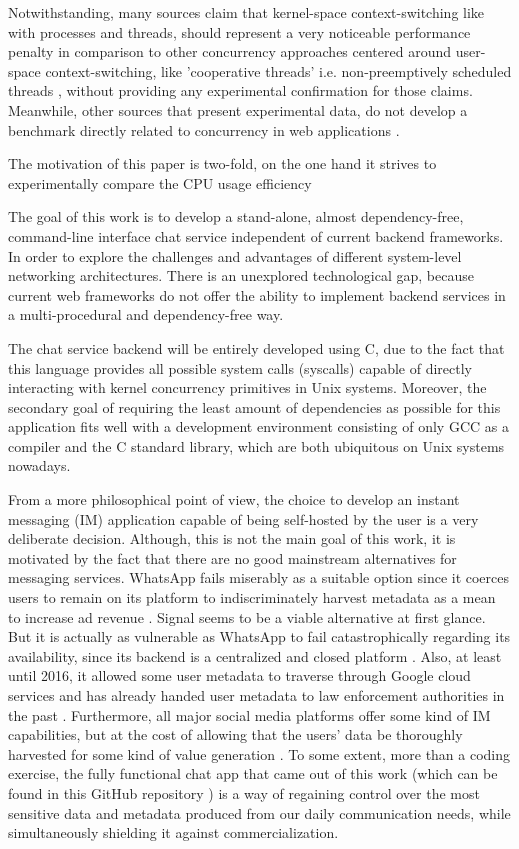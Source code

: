 Notwithstanding, many sources claim that kernel-space context-switching like with processes and threads, should represent a very noticeable performance penalty in comparison to other concurrency approaches centered around user-space context-switching, like 'cooperative threads' i.e. non-preemptively scheduled threads \cite{2003Events}\cite{2005Threads}\cite{Cox-Buday2017}\cite{Kerrisk2010}, without providing any experimental confirmation for those claims. Meanwhile, other sources that present experimental data, do not develop a benchmark directly related to concurrency in web applications \cite{2013ContextSwitching}. 

The motivation of this paper is two-fold, on the one hand it strives to experimentally compare the CPU usage efficiency

The goal of this work is to develop a stand-alone, almost dependency-free, command-line interface chat service independent of current backend frameworks. In order to explore the challenges and advantages of different system-level networking architectures. There is an unexplored technological gap, because current web frameworks do not offer the ability to implement backend services in a multi-procedural and dependency-free way. 

The chat service backend will be entirely developed using C, due to the fact that this language provides all possible system calls (syscalls) capable of directly interacting with kernel concurrency primitives in Unix systems. Moreover, the secondary goal of requiring the least amount of dependencies as possible for this application fits well with a development environment consisting of only GCC as a compiler and the C standard library, which are both ubiquitous on Unix systems nowadays. 

From a more philosophical point of view, the choice to develop an instant messaging (IM) application capable of being self-hosted by the user is a very deliberate decision. Although, this is not the main goal of this work, it is motivated by the fact that there are no good mainstream alternatives for messaging services. WhatsApp fails miserably as a suitable option since it coerces users to remain on its platform to indiscriminately harvest metadata as a mean to increase ad revenue \cite{Kumar2021}. Signal seems to be a viable alternative at first glance. But it is actually as vulnerable as WhatsApp to fail catastrophically regarding its availability, since its backend is a centralized and closed platform \cite{Hodgson2020}. Also, at least until 2016, it allowed some user metadata to traverse through Google cloud services \cite{Edge2016} and has already handed user metadata to law enforcement authorities in the past \cite{Kaufman2016}. Furthermore, all major social media platforms offer some kind of IM capabilities, but at the cost of allowing that the users' data be thoroughly harvested for some kind of value generation \cite{socialmedia2017}. To some extent, more than a coding exercise, the fully functional chat app that came out of this work (which can be found in this GitHub repository \cite{Rodriguez2022}) is a way of regaining control over the most sensitive data and metadata produced from our daily communication needs, while simultaneously shielding it against commercialization.